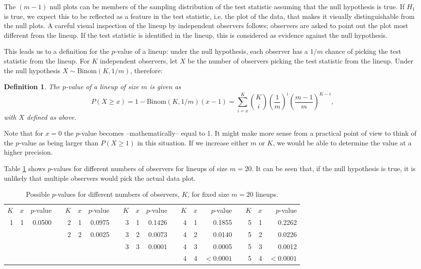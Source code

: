 \documentclass{article}
\newtheorem{dfn}{Definition}[section]
\begin{document}
\noindent The $(m-1)$ null plots can be members of the sampling distribution of the test statistic assuming that the null hypothesis is true. If $H_1$ is true, we expect this to be reflected as a feature in the test statistic, i.e. the plot of the data, that makes it visually distinguishable from the null plots. A careful visual inspection of the lineup by %
independent observers follows;  observers are asked to point out the plot most different from the lineup. If the test statistic is identified in the lineup, this is considered as evidence against the null hypothesis. 

This leads us to a definition for the $p$-value of a lineup: under the null hypothesis, each observer has a $1/m$ chance of picking the test statistic from the lineup.  For $K$ independent observers, let $X$ be  the number of observers picking the test statistic from the lineup. Under the null hypothesis $X \sim \text{Binom}({K, 1/m})$,  therefore: 

\begin{dfn}\label{dfn:pvalue}
The $p$-value of a lineup of size $m$ is given as 
\[
P(X \ge x) = 1 - \text{Binom}({K, 1/m}) (x-1) = \sum_{i=x}^{K} {K \choose i} \left(\frac{1}{m}\right)^{i} \left(\frac{m-1}{m}\right)^{K-i},
\]
with $X$ defined as above. 
\end{dfn}
Note that for $x=0$ the $p$-value becomes --mathematically-- equal to 1. It might make more sense from a practical point of view to think of the $p$-value as
being larger than $P(X \ge 1)$ in this situation. If we increase either $m$ or $K$, we would be able to determine the value at a higher precision.

\noindent Table \ref{pvalue} shows $p$-values for different numbers of observers for lineups of size $m = 20$. It can be seen that, if the null hypothesis is true, it is unlikely that multiple observers would pick the actual data plot.

\begin{table}[htp]
\caption{Possible $p$-values for different numbers of observers, $K$, for fixed size $m = 20$ lineups.}
\begin{center}
\begin{tabular}{rrrrrrrrrrrrrrrrrrr}
$K$ &  $x$ & $p$-value && $K$ &  $x$ & $p$-value && $K$ &  $x$ & $p$-value && $K$  & $x$ & $p$-value && $K$  & $x$ & $p$-value\\ \cline{1-3} \cline{5-7}\cline{9-11}\cline{13-15}\cline{17-19}
1 &  1 & 0.0500 && 2 &  1 & 0.0975 && 3 & 1 & 0.1426 && 4 & 1 & 0.1855 && 5 & 1 & 0.2262 \\%
&&&& 2 &  2 & 0.0025 && 3 & 2 & 0.0073 && 4 & 2 & 0.0140 && 5 & 2 & 0.0226 \\
&&&& &&&& 3 & 3 & 0.0001 && 4 & 3 & 0.0005 && 5 & 3 & 0.0012 \\%
&&&&  &    &        &   &   &        &&& 4 & 4 & $< 0.0001$ && 5 & 4 & $< 0.0001$ 
\end{tabular}
\end{center}
\label{pvalue}
\end{table}
\end{document}
